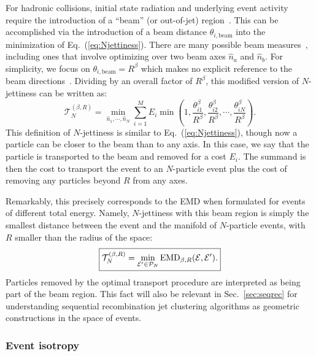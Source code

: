 \documentclass[letterpaper,11pt]{article}
\DeclareRobustCommand{\Sec}[1]{Sec.~\ref{#1}}
\DeclareRobustCommand{\Eq}[1]{Eq.~(\ref{#1})}
\begin{document}
For hadronic collisions, initial state radiation and underlying event activity require the introduction of a ``beam'' (or out-of-jet) region~\cite{Stewart:2009yx,Stewart:2010tn,Berger:2010xi}.
%
This can be accomplished via the introduction of a beam distance $\theta_{i,\text{beam}}$ into the minimization of \Eq{eq:Njettiness}.
%
There are many possible beam measures~\cite{Jouttenus:2013hs,Stewart:2015waa}, including ones that involve optimizing over two beam axes $\hat n_a$ and $\hat n_b$.
%
For simplicity, we focus on $\theta_{i,\text{beam}} = R^\beta$ which makes no explicit reference to the beam directions~\cite{Thaler:2011gf}.
%
Dividing by an overall factor of $R^\beta$, this modified version of $N$-jettiness can be written as:
%
\begin{equation}\label{eq:Njettiness_with_beam}
\mathcal T_N^{(\beta,R)} = \min_{\hat n_1,\cdots,\hat n_N} \sum_{i=1}^M E_i \min\left(1, \frac{\theta_{i1}^\beta}{R^\beta}, \frac{\theta_{i2}^\beta}{R^\beta}, \cdots, \frac{\theta_{iN}^\beta}{R^\beta}\right).
\end{equation}
%
This definition of $N$-jettiness is similar to \Eq{eq:Njettiness}, though now a particle can be closer to the beam than to any axis.
%
In this case, we say that the particle is transported to the beam and removed for a cost $E_i$.
%
The summand is then the cost to transport the event to an $N$-particle event plus the cost of removing any particles beyond $R$ from any axes.


Remarkably, this precisely corresponds to the EMD when formulated for events of different total energy.
%
Namely, $N$-jettiness with this beam region is simply the smallest distance between the event and the manifold of $N$-particle events, with $R$ smaller than the radius of the space:
%
\begin{equation}
\label{eq:Njettiness_with_beam_asEMD}
\begin{boxed}{
\mathcal T_N^{(\beta,R)} = \min_{\mathcal E'\in \mathcal P_N} \text{EMD}_{\beta,R}(\mathcal E, \mathcal E').
}\end{boxed}
\end{equation}
%
Particles removed by the optimal transport procedure are interpreted as being part of the beam region.
%
This fact will also be relevant in \Sec{sec:seqrec} for understanding sequential recombination jet clustering algorithms as geometric constructions in the space of events.


\subsubsection{Event isotropy}
\label{sec:isotropy}
\end{document}
